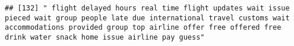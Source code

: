 \documentclass[
]{article}
\begin{document}
\begin{verbatim}
## [132] " flight delayed hours real time flight updates wait issue pieced wait group people late due international travel customs wait accommodations provided group top airline offer free offered free drink water snack home issue airline pay guess"                                                                                                                                                                                                                                                                                                                                                                                                                                                                                                                                                                                                                                                                                                                                                                                                                                                                                                                                                                                                                                                                                                                                                                                                                                                                                                                                                                                                                                                                                                                                                

\end{verbatim}
\end{document}
